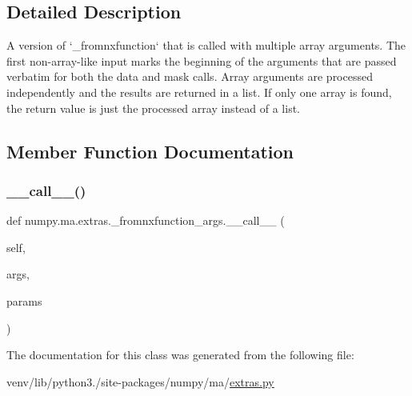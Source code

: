 \subsection{Detailed Description}
\begin{DoxyVerb}A version of `_fromnxfunction` that is called with multiple array
arguments. The first non-array-like input marks the beginning of the
arguments that are passed verbatim for both the data and mask calls.
Array arguments are processed independently and the results are
returned in a list. If only one array is found, the return value is
just the processed array instead of a list.
\end{DoxyVerb}
 

\subsection{Member Function Documentation}
\mbox{\label{classnumpy_1_1ma_1_1extras_1_1__fromnxfunction__args_a432a01769a988011b8959f74066ac5bd}} 
\subsubsection{\texorpdfstring{\+\_\+\+\_\+call\+\_\+\+\_\+()}{\_\_call\_\_()}}
{\footnotesize\ttfamily def numpy.\+ma.\+extras.\+\_\+fromnxfunction\+\_\+args.\+\_\+\+\_\+call\+\_\+\+\_\+ (\begin{DoxyParamCaption}\item[{}]{self,  }\item[{}]{args,  }\item[{}]{params }\end{DoxyParamCaption})}



The documentation for this class was generated from the following file\+:\begin{DoxyCompactItemize}
\item 
venv/lib/python3./site-\/packages/numpy/ma/\hyperlink{extras_8py}{extras.\+py}\end{DoxyCompactItemize}
